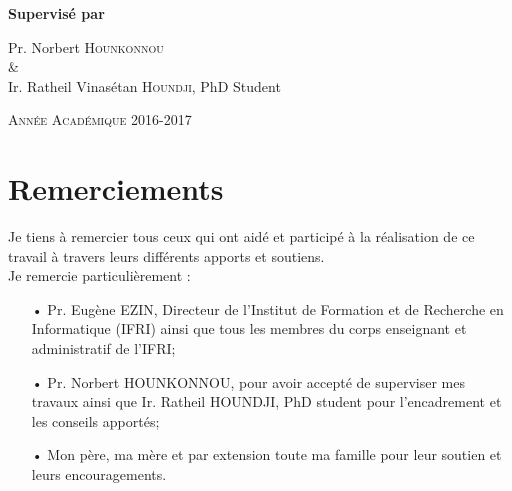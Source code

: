 \documentclass[12pt,a4paper]{article}
\begin{document}
\begin{titlepage}
		\vspace{1cm}{\scshape\Large Institut de Formation de Recherche en Informatique (IFRI)\par}
		\vspace{1cm}{\scshape\Large Mémoire pour l'obtention du diplôme de Master en Systèmes d'Information et Réseaux Informatiques\par}
		\vspace{1.5cm}{\huge\bfseries Résolution de "Pigment Sequencing Problem" avec les algorithmes génétiques\par}
		\vfill
		\Large\textbf{Supervisé par}\par Pr. Norbert \textsc{Hounkonnou} \\ \& \\ Ir. Ratheil Vinasétan \textsc{Houndji}, PhD Student
		\vfill
		{\large \scshape Année Académique 2016-2017 \par}
	\end{titlepage}

	\newpage %
	
	\section*{Remerciements}
	
	\vspace{2.5cm}
	
	Je tiens à remercier tous ceux qui ont aidé et participé à la réalisation de ce travail à travers leurs différents apports et soutiens. \\
	\hspace*{.5cm}Je remercie particulièrement : \\
	\begin{itemize}
		\item[•] Pr. Eugène EZIN, Directeur de l'Institut de Formation et de Recherche en Informatique (IFRI) ainsi que tous les membres du corps enseignant et administratif de l'IFRI;
		\item[•] Pr. Norbert HOUNKONNOU, pour avoir accepté de superviser mes travaux ainsi que Ir. Ratheil HOUNDJI, PhD student pour l'encadrement et les conseils apportés;
		\item[•] Mon père, ma mère et par extension toute ma famille pour leur soutien et leurs encouragements. 
	\end{itemize}
	
\end{document}
